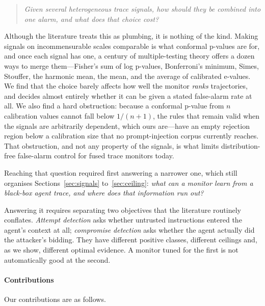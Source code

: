 \documentclass[pdflatex,sn-basic]{sn-jnl}%
\theoremstyle{thmstyleone}
\theoremstyle{thmstyletwo}
\theoremstyle{thmstylethree}
\begin{document}
\begin{quote}
\emph{Given several heterogeneous trace signals, how should they be combined into
one alarm, and what does that choice cost?}
\end{quote}

Although the literature treats this as plumbing, it is nothing of the kind.
Making signals on incommensurable scales comparable is what conformal p-values are
for, and once each signal has one, a century of multiple-testing theory offers a
dozen ways to
merge them---Fisher's sum of log p-values, Bonferroni's minimum, Simes, Stouffer,
the harmonic mean, the mean, and the average of calibrated e-values. We find that
the choice barely affects how well the monitor \emph{ranks} trajectories, and
decides almost entirely whether it can be given a stated false-alarm rate at all.
We also find a hard obstruction: because a conformal p-value from $n$ calibration
values cannot fall below $1/(n{+}1)$, the rules that remain valid when the signals
are arbitrarily dependent, which ours are---have an empty rejection region below a
calibration size that no prompt-injection corpus currently reaches. That
obstruction, and not any property of the signals, is what limits distribution-free
false-alarm control for fused trace monitors today.

Reaching that question required first answering a narrower one, which still
organises Sections~\ref{sec:signals} to~\ref{sec:ceiling}:
\emph{what can a monitor learn from a black-box agent trace, and where does that
information run out?}

Answering it requires separating two objectives that the literature routinely
conflates. \emph{Attempt detection} asks whether untrusted instructions entered
the agent's context at all; \emph{compromise detection} asks whether the agent
actually did the attacker's bidding. They have different positive classes,
different ceilings and, as we show, different optimal evidence. A monitor
tuned for the first is not automatically good at the second.

\paragraph{Contributions} Our contributions are as follows.
\end{document}
